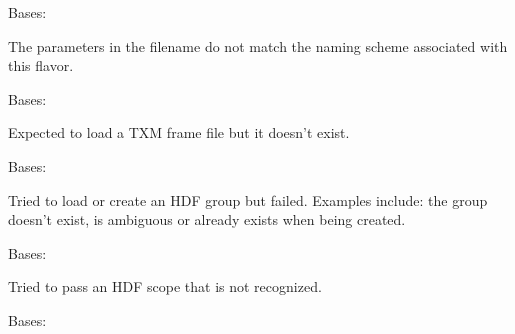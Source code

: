 \documentclass[letterpaper,10pt,english]{sphinxmanual}
\begin{document}

\begin{fulllineitems}
\label{\detokenize{xanespy:xanespy.exceptions.FilenameParseError}}
Bases: 

The parameters in the filename do not match the naming scheme
associated with this flavor.

\end{fulllineitems}


\begin{fulllineitems}
\label{\detokenize{xanespy:xanespy.exceptions.FrameFileNotFound}}
Bases: 

Expected to load a TXM frame file but it doesn't exist.

\end{fulllineitems}


\begin{fulllineitems}
\label{\detokenize{xanespy:xanespy.exceptions.GroupKeyError}}
Bases: 

Tried to load or create an HDF group but failed. Examples include:
the group doesn't exist, is ambiguous or already exists when being
created.

\end{fulllineitems}


\begin{fulllineitems}
\label{\detokenize{xanespy:xanespy.exceptions.HDFScopeError}}
Bases: 

Tried to pass an HDF scope that is not recognized.

\end{fulllineitems}


\begin{fulllineitems}
\label{\detokenize{xanespy:xanespy.exceptions.NoParticleError}}
Bases: 

\end{fulllineitems}
\end{document}
